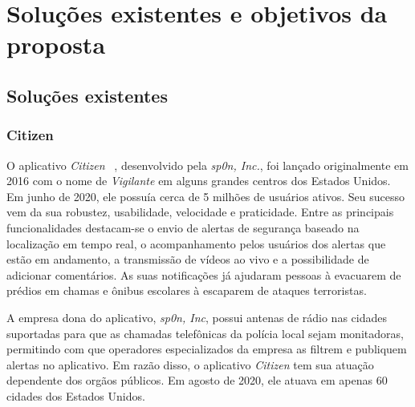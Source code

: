 \chapter{Soluções existentes e objetivos da proposta}
\label{c.solucoes-existentes-e-objetivos}



\section{Soluções existentes}
\label{c.solucoes-existentes}


\subsection{Citizen}

O aplicativo \emph{Citizen} ~\cite{citizen}, desenvolvido pela \emph{sp0n, Inc.}, foi lançado originalmente em 2016 com o nome de \emph{Vigilante} em alguns grandes centros dos Estados Unidos. Em junho de 2020, ele possuía cerca de 5 milhões de usuários ativos. Seu sucesso vem da sua robustez, usabilidade, velocidade e praticidade. Entre as principais funcionalidades destacam-se o envio de alertas de segurança baseado na localização em tempo real, o acompanhamento pelos usuários dos alertas que estão em andamento, a transmissão de vídeos ao vivo e a possibilidade de adicionar comentários. As suas notificações já ajudaram pessoas à evacuarem de prédios em chamas e ônibus escolares à escaparem de ataques terroristas. 

A empresa dona do aplicativo, \emph{sp0n, Inc}, possui antenas de rádio nas cidades suportadas para que as chamadas telefônicas da polícia local sejam monitadoras, permitindo com que operadores especializados da empresa as filtrem e publiquem alertas no aplicativo. Em razão disso, o aplicativo \emph{Citizen} tem sua atuação dependente dos orgãos públicos. Em agosto de 2020, ele atuava em apenas 60 cidades dos Estados Unidos.

